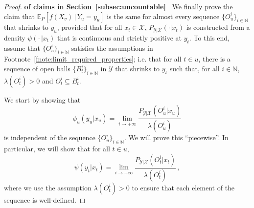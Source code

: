 \documentclass[twoside,11pt]{article}
\newcommand{\nats}{\mathbb{N}}
\newcommand{\states}{\mathcal{X}}
\newcommand{\observs}{\mathcal{Y}}
\begin{document}
\begin{proof}{\bf of claims in Section~\ref{subsec:uncountable}~}
We finally prove the claim that $\mathbb{E}_P[f(X_v)\,\vert\,Y_u=y_u]$ is the same for almost every sequence $\{O_u^i\}_{i\in\nats}$ that shrinks to $y_u$, provided that for all $x_t\in\states$, $P_{\observs\vert\states}(\cdot\vert x_t)$ is constructed from a density $\psi(\cdot\,\vert x_t)$ that is continuous and strictly positive at $y_t$. To this end, assume that $\{O_u^i\}_{i\in\nats}$ satisfies the assumptions in Footnote~\ref{fnote:limit_required_properties}; i.e. that for all $t\in u$, there is a sequence of open balls $\{B_t^i\}_{i\in\nats}$ in $\observs$ that shrinks to $y_t$ such that, for all $i\in\nats$, $\lambda(O_t^i)>0$ and $O_t^i\subseteq B_t^i$.


We start by showing that
\begin{equation*}
\phi_u(y_u\vert x_u) = \lim_{i\to+\infty} \frac{P_{\observs\vert\states}(O_u^i\vert x_u)}{\lambda(O_u^i)}
\end{equation*}
is independent of the sequence $\{O_u^i\}_{i\in\nats}$. We will prove this ``piecewise''. In particular, we will show that for all $t\in u$,
\begin{equation*}
\psi(y_t\vert x_t) = \lim_{i\to+\infty} \frac{P_{\observs\vert\states}(O_t^i\vert x_t)}{\lambda(O_t^i)}\,,
\end{equation*}
where we use the assumption $\lambda(O_t^i)>0$ to ensure that each element of the sequence is well-defined.


\end{proof}
\end{document}
